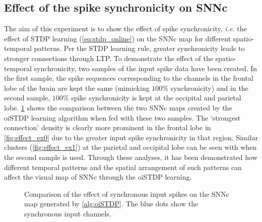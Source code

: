 \subsection{Effect of the spike synchronicity on SNNc}
The aim of this experiment is to show the effect of spike synchronicity, \emph{i.e.} the effect of STDP learning (\equationname \ref{eq:stdp_online}) on the SNNc map for different spatio-temporal patterns. Per the STDP learning rule, greater synchronicity leads to stronger connections through LTP. To demonstrate the effect of the spatio-temporal synchronicity, two samples of the input spike data have been created. In the first sample, the spike sequences corresponding to the channels in the frontal lobe of the brain are kept the same (mimicking $100\%$ synchronicity) and in the second sample, $100\%$ spike synchronicity is kept at the occipital and parietal lobe. \figurename \ref{fig:activity_effect} shows the comparison between the two SNNc maps created by the oiSTDP learning algorithm when fed with these two samples. The `strongest connection' density is clearly more prominent in the frontal lobe in \figurename \ref{fig:effect_ex0} due to the greater input spike synchronicity in that region. Similar clusters (\figurename \ref{fig:effect_ex1}) at the parietal and occipital lobe can be seen with when the second sample is used. Through these analyses, it has been demonstrated how different temporal patterns and the spatial arrangement of such patterns can affect the visual map of SNNc through the oiSTDP learning.

\begin{figure}
\centering
	\hfill
	\caption{Comparison of the effect of synchronous input spikes on the SNNc map generated by \algorithmname \ref{alg:oiSTDP}. The blue dots show the synchronous input channels.}
	
	\label{fig:activity_effect}
\end{figure}

